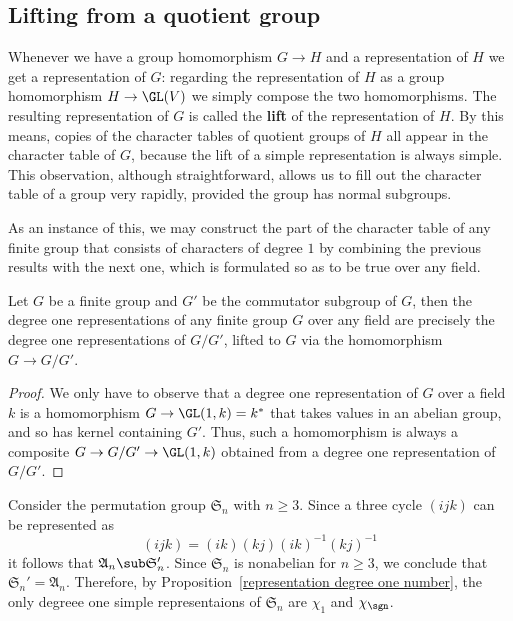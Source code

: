 \subsection{Lifting from a quotient group}
Whenever we have a group homomorphism $G\to H$ and a representation of $H$ we get a representation of $G$: regarding the representation of $H$ as a group homomorphism $H\to\GL(V)$ we simply compose the two homomorphisms. The resulting representation of $G$ is called the \textbf{lift} of the representation of $H$. By this means, copies of the character tables of quotient groups of $H$ all appear in the character table of $G$, because the lift of a simple representation is always simple. This observation, although straightforward, allows us to fill out the character table of a group very rapidly, provided the group has normal subgroups.\par
As an instance of this, we may construct the part of the character table of any finite group that consists of characters of degree $1$ by combining the previous results with the next one, which is formulated so as to be true over any field.
\begin{proposition}\label{representation degree one number}
Let $G$ be a finite group and $G'$ be the commutator subgroup of $G$, then the degree one representations of any finite group $G$ over any field are precisely the degree one representations of $G/G'$, lifted to $G$ via the
homomorphism $G\to G/G'$.
\end{proposition}
\begin{proof}
We only have to observe that a degree one representation of $G$ over a field $k$ is a homomorphism $G\to\GL(1,k)=k^*$ that takes values in an abelian group, and so has kernel containing $G'$. Thus, such a homomorphism is always a composite $G\to G/G'\to\GL(1,k)$ obtained from a degree one representation of $G/G'$.
\end{proof}
\begin{example}
Consider the permutation group $\mathfrak{S}_n$ with $n\geq 3$. Since a three cycle $(ijk)$ can be represented as
\[(ijk)=(ik)(kj)(ik)^{-1}(kj)^{-1}\]
it follows that $\mathfrak{A}_n\sub\mathfrak{S}_n'$. Since $\mathfrak{S}_n$ is nonabelian for $n\geq 3$, we conclude that $\mathfrak{S}_n'=\mathfrak{A}_n$. Therefore, by Proposition~\ref{representation degree one number}, the only degreee one simple representaions of $\mathfrak{S}_n$ are $\chi_1$ and $\chi_{\sgn}$.
\end{example}
